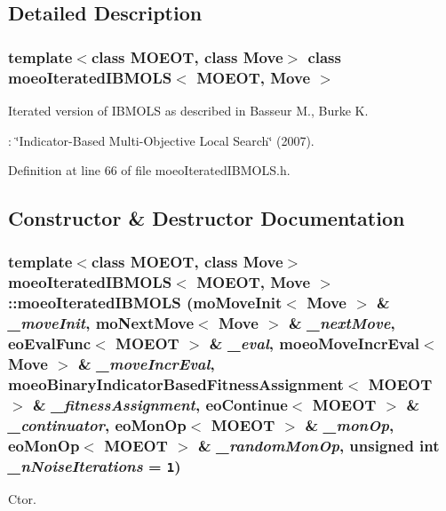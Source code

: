\subsection{Detailed Description}
\subsubsection*{template$<$class MOEOT, class Move$>$ class moeo\-Iterated\-IBMOLS$<$ MOEOT, Move $>$}

Iterated version of IBMOLS as described in Basseur M., Burke K. 

: \char`\"{}Indicator-Based Multi-Objective Local Search\char`\"{} (2007). 



Definition at line 66 of file moeo\-Iterated\-IBMOLS.h.

\subsection{Constructor \& Destructor Documentation}
\subsubsection{\setlength{\rightskip}{0pt plus 5cm}template$<$class MOEOT, class Move$>$ \bf{moeo\-Iterated\-IBMOLS}$<$ MOEOT, Move $>$::\bf{moeo\-Iterated\-IBMOLS} (mo\-Move\-Init$<$ Move $>$ \& {\em \_\-move\-Init}, mo\-Next\-Move$<$ Move $>$ \& {\em \_\-next\-Move}, eo\-Eval\-Func$<$ MOEOT $>$ \& {\em \_\-eval}, \bf{moeo\-Move\-Incr\-Eval}$<$ Move $>$ \& {\em \_\-move\-Incr\-Eval}, \bf{moeo\-Binary\-Indicator\-Based\-Fitness\-Assignment}$<$ MOEOT $>$ \& {\em \_\-fitness\-Assignment}, eo\-Continue$<$ MOEOT $>$ \& {\em \_\-continuator}, eo\-Mon\-Op$<$ MOEOT $>$ \& {\em \_\-mon\-Op}, eo\-Mon\-Op$<$ MOEOT $>$ \& {\em \_\-random\-Mon\-Op}, unsigned int {\em \_\-n\-Noise\-Iterations} = {\tt 1})\hspace{0.3cm}{\tt  [inline]}}\label{classmoeoIteratedIBMOLS_67352bb5d797f20e767a4f0fa6d80f93}


Ctor. 

